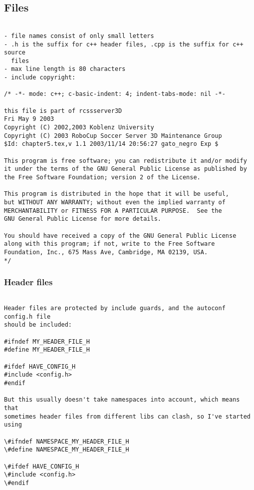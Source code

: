 \subsection{Files}
\begin{verbatim}

- file names consist of only small letters
- .h is the suffix for c++ header files, .cpp is the suffix for c++ source 
  files
- max line length is 80 characters
- include copyright:

/* -*- mode: c++; c-basic-indent: 4; indent-tabs-mode: nil -*-
   
this file is part of rcssserver3D
Fri May 9 2003
Copyright (C) 2002,2003 Koblenz University
Copyright (C) 2003 RoboCup Soccer Server 3D Maintenance Group
$Id: chapter5.tex,v 1.1 2003/11/14 20:56:27 gato_negro Exp $

This program is free software; you can redistribute it and/or modify
it under the terms of the GNU General Public License as published by
the Free Software Foundation; version 2 of the License.
  
This program is distributed in the hope that it will be useful,
but WITHOUT ANY WARRANTY; without even the implied warranty of
MERCHANTABILITY or FITNESS FOR A PARTICULAR PURPOSE.  See the
GNU General Public License for more details.
 
You should have received a copy of the GNU General Public License
along with this program; if not, write to the Free Software
Foundation, Inc., 675 Mass Ave, Cambridge, MA 02139, USA.
*/

\end{verbatim}
\subsubsection{Header files}
\begin{verbatim}

Header files are protected by include guards, and the autoconf config.h file
should be included:

#ifndef MY_HEADER_FILE_H
#define MY_HEADER_FILE_H

#ifdef HAVE_CONFIG_H
#include <config.h>
#endif

But this usually doesn't take namespaces into account, which means that 
sometimes header files from different libs can clash, so I've started using

\#ifndef NAMESPACE_MY_HEADER_FILE_H
\#define NAMESPACE_MY_HEADER_FILE_H

\#ifdef HAVE_CONFIG_H
\#include <config.h>
\#endif

\end{verbatim}

